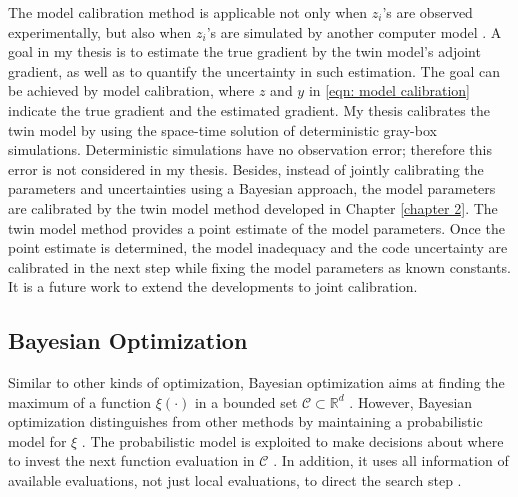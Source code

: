 The model calibration method is applicable not only when $z_i$'s are observed experimentally, 
but also when $z_i$'s are simulated by another computer model \cite{KennedyOhagan1}.
A goal in my thesis is to estimate the true gradient by the twin model's
adjoint gradient, as well as to quantify the uncertainty in such estimation.
The goal can be achieved by model calibration, where $z$ and $y$ in \eqref{eqn: model calibration}
indicate the true gradient and the estimated gradient.
My thesis calibrates the twin model by using the space-time solution of deterministic
gray-box simulations. Deterministic simulations have no observation error; therefore
this error is not considered in my thesis. Besides, instead of jointly calibrating
the parameters and uncertainties using a Bayesian approach, 
the model parameters are calibrated by the twin model method 
developed in Chapter \ref{chapter 2}. The twin model
method provides a point estimate of the model parameters. 
Once the point estimate is determined, the model inadequacy and the code uncertainty 
are calibrated in the next step while fixing the model parameters as known constants.
It is a future work to extend the developments to joint calibration.\\


\subsection{Bayesian Optimization}
\label{section: bayes opt}
Similar to other kinds of optimization, Bayesian optimization aims at finding the maximum
of a function $\xi(\cdot)$ in a bounded set $\mathcal{C}\subset \mathbb{R}^d$ 
\cite{practical Bayesian, review EI, jones1998}. However,
Bayesian optimization distinguishes from other methods by maintaining a probabilistic
model for $\xi$ \cite{practical Bayesian, review EI, jones1998}. 
The probabilistic model is exploited to 
make decisions about where to invest the next function evaluation in $\mathcal{C}$ 
\cite{practical Bayesian, review EI, jones1998}.
In addition, it uses all information of available evaluations, not just local evaluations,
to direct the search step 
\cite{practical Bayesian, review EI, jones1998}.\\

